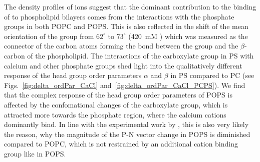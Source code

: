 The density profiles of ions suggest that
the dominant contribution to the binding of  to phospholipid bilayers
comes from the interactions with the phosphate groups in both POPC and POPS. 
This is also reflected in the shift of the mean orientation 
of the  group from $62^\circ$ to $73^\circ$ (420~mM )
which was measured as the connector of the carbon atoms 
forming the bond between the group and the $\beta$-carbon of the phospholipid. 
The interactions of the carboxylate group in PS with calcium and other phosphate groups
shed light into the qualitatively different response of the head group order parameters $\alpha$ and $\beta$ in PS compared to PC 
(see Figs.~\ref{fig:delta_ordPar_CaCl} and~\ref{fig:delta_ordPar_CaCl_PCPS}). 
We find that the complex response of the head group order parameters of POPS 
is affected by the confomational changes of the carboxylate group,
which is attracted more towards the phosphate region, 
where the calcium cations dominantly bind. 
In line with the experimental work by \citet{browning80},
this is also very likely the reason, 
why the magnitude of the P-N vector change in POPS is diminished compared to POPC, 
which is not restrained by an additional cation binding group like  in POPS. 


